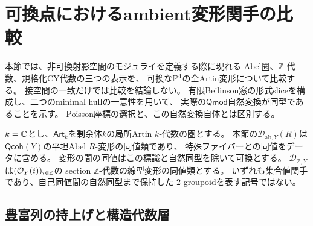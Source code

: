\section{可換点におけるambient変形関手の比較}
\label{sec:formal-ambient-comparison}

本節では、非可換射影空間のモジュライを定義する際に現れる
Abel圏、$\mathbb Z$-代数、規格化CY代数の三つの表示を、
可換な$\mathbb P^4$の全Artin変形について比較する。
接空間の一致だけでは比較を結論しない。
有限Beilinson窓の形式sliceを構成し、二つのminimal hullの一意性を用いて、
実際の$\mathsf{Qmod}$自然変換が同型であることを示す。
Poisson座標の選択と、この自然変換自体とは区別する。

$k=\mathbb C$とし、$\mathsf{Art}_k$を剰余体$k$の局所Artin $k$-代数の圏とする。
本節の$\mathcal D_{\mathrm{ab},Y}(R)$は
$\mathsf{Qcoh}(Y)$の平坦Abel $R$-変形の同値類であり、
特殊ファイバーとの同値をデータに含める。
変形の間の同値はこの標識と自然同型を除いて可換とする。
$\mathcal D_{\mathbb Z,Y}$は$(\mathcal O_Y(i))_{i\in\mathbb Z}$の
section $\mathbb Z$-代数の線型変形の同値類とする。
いずれも集合値関手であり、自己同値間の自然同型まで保持した
$2$-groupoidを表す記号ではない。

\subsection{豊富列の持上げと構造代数層}

